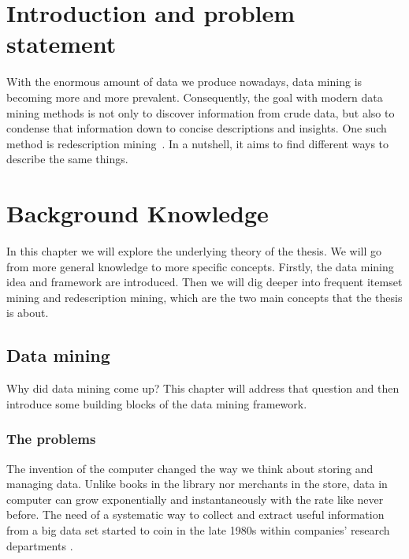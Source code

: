\chapter{Introduction and problem statement}
\label{cha:intro}
With the enormous amount of data we produce nowadays, data mining is becoming more and more prevalent.
Consequently, the goal with modern data mining methods is not only to discover information from crude data, but also to condense that information down to concise descriptions and insights.
One such method is redescription mining~\citep{ramakrishnan_turning_2004}.
In a nutshell, it aims to find different ways to describe the same things.

\chapter{Background Knowledge}
\label{cha:background}
In this chapter we will explore the underlying theory of the thesis.
We will go from more general knowledge to more specific concepts.
Firstly, the data mining idea and framework are introduced.
Then we will dig deeper into frequent itemset mining and redescription mining, which are the two main concepts that the thesis is about.
\section{Data mining}
\label{sec:datamining}
Why did data mining come up?
This chapter will address that question and then introduce some building blocks of the data mining framework.
\subsection{The problems}
\label{sub:the_problems}
The invention of the computer changed the way we think about storing and managing data.
Unlike books in the library nor merchants in the store, data in computer can grow exponentially and instantaneously with the rate like never before.
The need of a systematic way to collect and extract useful information from a big data set started to coin in the late 1980s within companies' research departments \citep{coenen_datamining_2011}.

